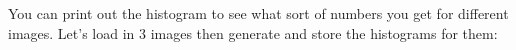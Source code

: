 You can print out the histogram to see what sort of numbers you get for different images. 
Let's load in 3 images then generate and store the histograms for them:
